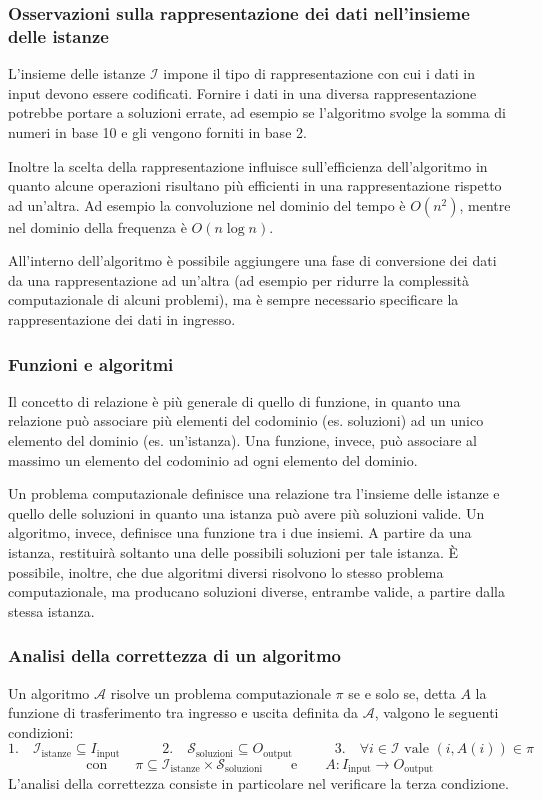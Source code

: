 \subsubsection*{Osservazioni sulla rappresentazione dei dati nell'insieme delle istanze}
L'insieme delle istanze \(\mathcal{I}\) impone il tipo di rappresentazione con cui i dati in input devono essere codificati.
Fornire i dati in una diversa rappresentazione potrebbe portare a soluzioni errate, ad esempio se l'algoritmo svolge la somma
di numeri in base 10 e gli vengono forniti in base 2.

Inoltre la scelta della rappresentazione influisce sull'efficienza dell'algoritmo in quanto alcune operazioni risultano
più efficienti in una rappresentazione rispetto ad un'altra. Ad esempio la convoluzione nel dominio del tempo è \(O(n^2)\),
mentre nel dominio della frequenza è \(O(n \log n)\).

All'interno dell'algoritmo è possibile aggiungere una fase di conversione dei dati da una rappresentazione ad un'altra
(ad esempio per ridurre la complessità computazionale di alcuni problemi), ma è sempre necessario specificare la
rappresentazione dei dati in ingresso.

\subsubsection*{Funzioni e algoritmi}
Il concetto di relazione è più generale di quello di funzione, in quanto una relazione può associare più elementi del
codominio (es. soluzioni) ad un unico elemento del dominio (es. un'istanza). Una funzione, invece, può associare al massimo
un elemento del codominio ad ogni elemento del dominio.

Un problema computazionale definisce una relazione tra l'insieme delle istanze e quello delle soluzioni in quanto una istanza
può avere più soluzioni valide. Un algoritmo, invece, definisce una funzione tra i due insiemi. A partire da una istanza,
restituirà soltanto una delle possibili soluzioni per tale istanza. È possibile, inoltre, che due algoritmi diversi risolvono
lo stesso problema computazionale, ma producano soluzioni diverse, entrambe valide, a partire dalla stessa istanza.

\subsubsection*{Analisi della correttezza di un algoritmo}
Un algoritmo \(\mathcal{A}\) risolve un problema computazionale \(\pi\) se e solo se, detta \(A\) la funzione di trasferimento
tra ingresso e uscita definita da \(\mathcal{A}\), valgono le seguenti condizioni:
\[1. \quad \mathcal{I}_\text{istanze} \subseteq I_\text{input} \qquad\quad 2. \quad \mathcal{S}_\text{soluzioni} \subseteq O_\text{output} \qquad\quad 3. \quad \forall i \in \mathcal{I} \text{ vale } (i, A(i)) \in \pi\]
\[\text{con} \qquad \pi \subseteq \mathcal{I}_\text{istanze} \times \mathcal{S}_\text{soluzioni} \qquad \text{e} \qquad A: I_\text{input} \to O_\text{output}\]
L'analisi della correttezza consiste in particolare nel verificare la terza condizione.

